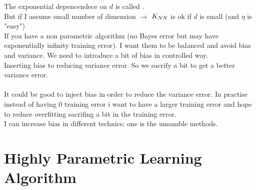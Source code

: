 \documentclass[../main.tex]{subfiles}
\begin{document}
The exponential depencendece on $d$ is called .
\\ But if I assume small number of dimension $\longrightarrow$ $K_{NN}$ is ok if $d$ is small (and $\eta$ is "easy")
\\
If you have a non parametric algorithm (no Bayes error but may have exponentially infinity training error).
I want them to be balanced and avoid bias and variance. We need to introduce a bit of bias in controlled way.
\\
Inserting bias to reducing variance error. So we sacrify a bit to get a better variance error.
\\\\
It could be good to inject bias in order to reduce the variance error. In practise instead of having 0 training error i want to have a larger training error and hope to reduce overfitting sacrifing a bit in the training error.
\\
I can increase bias in different technics: one is the unsamble methods.


\section{Highly Parametric Learning Algorithm}
\end{document}
